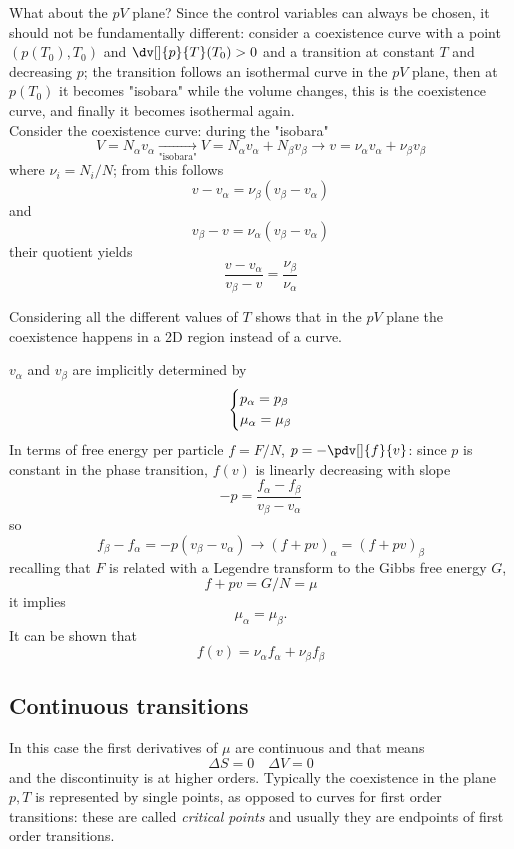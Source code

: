 What about the $pV$ plane? Since the control variables can always be chosen, it should
not be fundamentally different: consider a coexistence curve with a point
$(p(T_0),T_0)$ and $\dv[]{p}{T}(T_0)>0$ and a transition at constant $T$ and
decreasing $p$; the transition follows an isothermal curve in the $pV$ plane, then
at $p(T_0)$ it becomes "isobara" while the volume changes, this is the coexistence
curve, and finally it becomes isothermal again.\\
Consider the coexistence curve: during the "isobara"
$$V = N_\alpha v_\alpha \underset{\text{"isobara"}}\longrightarrow V = N_\alpha
v_\alpha + N_\beta v_\beta\rightarrow v = \nu_\alpha v_\alpha + \nu_\beta v_\beta$$
where $\nu_i = N_i/N$; from this follows
$$v-v_\alpha = \nu_\beta(v_\beta-v_\alpha)$$
and
$$v_\beta - v = \nu_\alpha(v_\beta-v_\alpha)$$
their quotient yields
$$\frac{v-v_\alpha}{v_\beta-v} = \frac{\nu_\beta}{\nu_\alpha}$$

Considering all the different values of $T$ shows that in the $pV$ plane
the coexistence happens in a 2D region instead of a curve.

$v_\alpha$ and $v_\beta$ are implicitly determined by
$$\begin{dcases*}
  p_\alpha = p_\beta\\
  \mu_\alpha = \mu_\beta
  \end{dcases*}$$
In terms of free energy per particle $f = F/N$, $p = -\pdv[]{f}{v}$:
since $p$ is constant in the phase transition, $f(v)$ is linearly decreasing with
slope
$$-p = \frac{f_\alpha - f_\beta}{v_\beta-v_\alpha}$$ 
so
$$f_\beta-f_\alpha = -p (v_\beta-v_\alpha) \rightarrow (f+pv)_\alpha = (f+pv)_\beta$$
recalling that $F$ is related with a Legendre transform to the Gibbs free energy $G$,
$$f+pv = G/N = \mu$$
it implies
$$\mu_\alpha = \mu_\beta.$$
It can be shown that
$$f(v) = \nu_\alpha f_\alpha + \nu_\beta f_\beta$$
\subsection{Continuous transitions}
In this case the first derivatives of $\mu$ are continuous and that means
$$\Delta S = 0\quad\Delta V = 0$$
and the discontinuity is at higher orders. Typically the coexistence in the
plane $p,T$ is represented by single points, as opposed to curves for first
order transitions: these are called \textit{critical points} and usually they
are endpoints of first order transitions.

